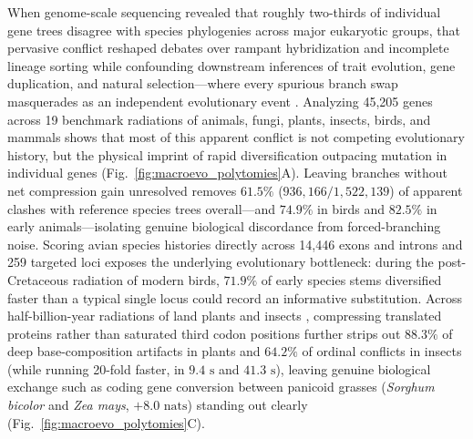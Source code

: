 \documentclass[11pt,a4paper]{article}
\begin{document}
When genome-scale sequencing revealed that roughly two-thirds of individual gene trees disagree with species phylogenies across major eukaryotic groups, that pervasive conflict reshaped debates over rampant hybridization and incomplete lineage sorting while confounding downstream inferences of trait evolution, gene duplication, and natural selection---where every spurious branch swap masquerades as an independent evolutionary event \citep{rokas2006animal,shen2017contentious}. Analyzing 45,205 genes across 19 benchmark radiations of animals, fungi, plants, insects, birds, and mammals \citep{zhou2018evaluating} shows that most of this apparent conflict is not competing evolutionary history, but the physical imprint of rapid diversification outpacing mutation in individual genes (Fig.~\ref{fig:macroevo_polytomies}A). Leaving branches without net compression gain unresolved removes $61.5\%$ ($936,166 / 1,522,139$) of apparent clashes with reference species trees overall---and $74.9\%$ in birds and $82.5\%$ in early animals---isolating genuine biological discordance from forced-branching noise. Scoring avian species histories directly across 14,446 exons and introns \citep{jarvis2014whole} and 259 targeted loci \citep{prum2015comprehensive} exposes the underlying evolutionary bottleneck: during the post-Cretaceous radiation of modern birds, $71.9\%$ of early species stems diversified faster than a typical single locus could record an informative substitution. Across half-billion-year radiations of land plants \citep{wickett2014phylotranscriptomic} and insects \citep{misof2014phylogenomics}, compressing translated proteins rather than saturated third codon positions further strips out $88.3\%$ of deep base-composition artifacts in plants and $64.2\%$ of ordinal conflicts in insects (while running 20-fold faster, in $9.4\text{ s}$ and $41.3\text{ s}$), leaving genuine biological exchange such as coding gene conversion between panicoid grasses (\textit{Sorghum bicolor} and \textit{Zea mays}, $+8.0\text{ nats}$) standing out clearly (Fig.~\ref{fig:macroevo_polytomies}C).
\end{document}
